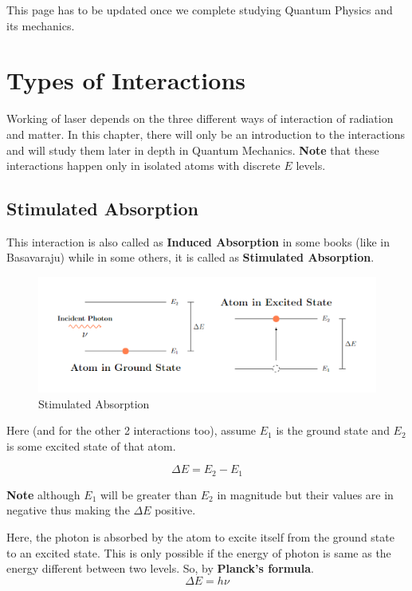 \documentclass[12pt]{article}
\begin{document}
This page has to be updated once we complete studying Quantum Physics and its mechanics.

\section{Types of Interactions}

Working of laser depends on the three different ways of interaction of radiation and matter. In this chapter, there will only be an introduction to the interactions and will study them later in depth in Quantum Mechanics. \textbf{Note} that these interactions happen only in isolated atoms with discrete $E$ levels.

\subsection{Stimulated Absorption}

This interaction is also called as \textbf{Induced Absorption} in some books (like in Basavaraju) while in some others, it is called as \textbf{Stimulated Absorption}.

\begin{figure}[H]
    \centering
    \includegraphics[scale=0.8]{./img/03_induced_absorption.png}
    \caption{Stimulated Absorption}
\end{figure}

Here (and for the other 2 interactions too), assume $E_{1}$ is the ground state and $E_{2}$ is some excited state of that atom.

\begin{equation}
    \Delta E = E_{2} - E_{1}
\end{equation}

\textbf{Note} although $E_{1}$ will be greater than $E_{2}$ in magnitude but their values are in negative thus making the $\Delta E$ positive. \vspace{.2cm}

Here, the photon is absorbed by the atom to excite itself from the ground state to an excited state. This is only possible if the energy of photon is same as the energy different between two levels. So, by \textbf{Planck's formula}.
\begin{equation}
    \Delta E = h\nu
\end{equation}
\end{document}
